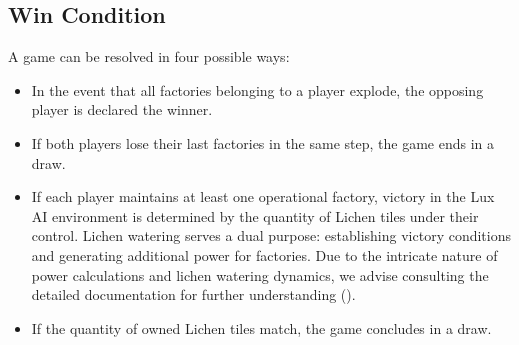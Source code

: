     \subsection{Win Condition}
    \label{sec:wincondition}
    
        \noindent A game can be resolved in four possible ways:
        
        \begin{itemize}[itemsep=4pt, parsep=0pt]
        \item 
        In the event that all factories belonging to a player explode, the opposing player is declared the winner.
        \item 
        If both players lose their last factories in the same step, the game ends in a draw.
        \item If each player maintains at least one operational factory, victory in the Lux AI environment is determined by the quantity of Lichen tiles under their control. Lichen watering serves a dual purpose: establishing victory conditions and generating additional power for factories. Due to the intricate nature of power calculations and lichen watering dynamics, we advise consulting the detailed documentation for further understanding (\textcolor{deepblue}{\cite{lux-ai-season-2}}).
        \item If the quantity of owned Lichen tiles match, the game concludes in a draw.
        \end{itemize}
        \noindent







